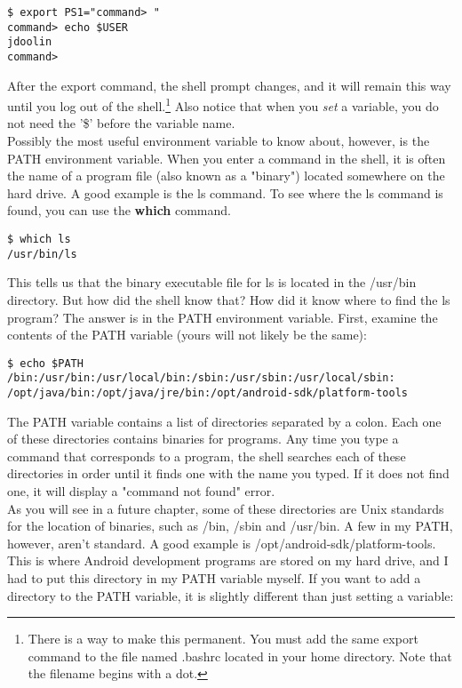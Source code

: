 \begin{verbatim}
$ export PS1="command> "
command> echo $USER
jdoolin
command>
\end{verbatim}

After the export command, the shell prompt changes, and it will remain this way until you log out of the shell.\footnote{There is a way to make this permanent. You must add the same export command to the file named .bashrc located in your home directory. Note that the filename begins with a dot.}  Also notice that when you \textit{set} a variable, you do not need the '\$' before the variable name.\\  

Possibly the most useful environment variable to know about, however, is the PATH environment variable.  When you enter a command in the shell, it is often the name of a program file (also known as a "binary") located somewhere on the hard drive.  A good example is the ls command.  To see where the ls command is found, you can use the \textbf{which} command.

\begin{verbatim}
$ which ls
/usr/bin/ls
\end{verbatim}

This tells us that the binary executable file for ls is located in the /usr/bin directory.  But how did the shell know that?  How did it know where to find the ls program?  The answer is in the PATH environment variable.  First, examine the contents of the PATH variable (yours will not likely be the same):

\begin{verbatim}
$ echo $PATH
/bin:/usr/bin:/usr/local/bin:/sbin:/usr/sbin:/usr/local/sbin:
/opt/java/bin:/opt/java/jre/bin:/opt/android-sdk/platform-tools
\end{verbatim}

The PATH variable contains a list of directories separated by a colon.  Each one of these directories contains binaries for programs.  Any time you type a command that corresponds to a program, the shell searches each of these directories in order until it finds one with the name you typed.  If it does not find one, it will display a "command not found" error.\\

As you will see in a future chapter, some of these directories are Unix standards for the location of binaries, such as /bin, /sbin and /usr/bin.  A few in my PATH, however, aren't standard.  A good example is /opt/android-sdk/platform-tools.  This is where Android development programs are stored on my hard drive, and I had to put this directory in my PATH variable myself.  If you want to add a directory to the PATH variable, it is slightly different than just setting a variable:


